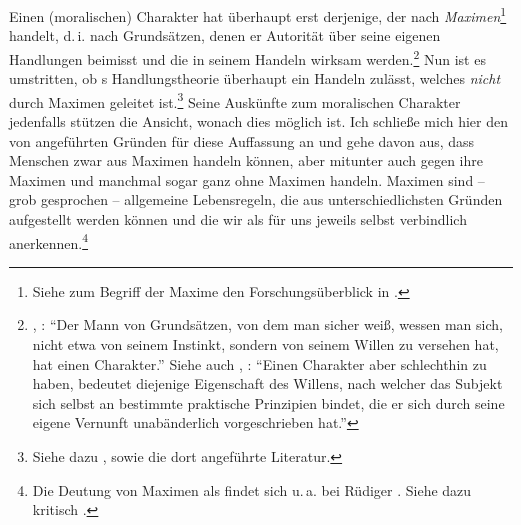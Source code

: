 \label{Abschnitt:MaximenHandlungenFreiheit}
Einen (moralischen) Charakter hat überhaupt erst derjenige, der nach
\emph{Maximen}\footnote{Siehe zum Begriff der Maxime den Forschungsüberblick in
\cite{Gressis:RecentWorkonKantianMaxims2010,Gressis:RecentWorkonKantianMaximsI:EstablishedApproaches2010}.}
handelt, d.\,i. nach Grund\-sät\-zen, denen er Autorität über seine eigenen
Handlungen beimisst und die in seinem Handeln wirksam
werden.\footnote{\cite[Vgl.][A~256]{Kant:AnthropologieinpragmatischerHinsicht1977},
\cite[VII: 285.13--15]{Kant:GesammelteWerke1900ff.}: \enquote{Der Mann von
Grundsätzen, von dem man sicher weiß, wessen man sich, nicht etwa von seinem
Instinkt, sondern von seinem Willen zu versehen hat, hat einen Charakter.} Siehe
auch \cite[A~266]{Kant:AnthropologieinpragmatischerHinsicht1977}, \cite[VII:
292.6--9]{Kant:GesammelteWerke1900ff.}: \enquote{Einen Charakter aber
schlechthin zu haben, bedeutet diejenige Eigenschaft des Willens, nach welcher
das Subjekt sich selbst an bestimmte praktische Prinzipien bindet, die er sich
durch seine eigene Vernunft unabänderlich vorgeschrieben hat.}} Nun ist es
umstritten, ob s Handlungstheorie überhaupt ein
Handeln zulässt, welches \emph{nicht} durch Maximen geleitet ist.\footnote{Siehe
dazu
\cite[][89--92]{Schuessler:KantsethischesLuegenverbot--derSonderfallderLuegeausFurcht2013},
sowie die dort angeführte Literatur.} Seine Auskünfte zum moralischen Charakter
jedenfalls stützen die Ansicht, wonach dies möglich ist. Ich schließe
mich hier den von
angeführten Gründen für diese Auffassung an und gehe davon aus, dass
Menschen zwar aus Maximen handeln können, aber mitunter auch gegen ihre Maximen
und manchmal sogar ganz ohne Maximen handeln. Maximen sind -- grob gesprochen --
allgemeine Lebensregeln, die aus unterschiedlichsten Gründen aufgestellt werden
können und die wir als für uns jeweils selbst verbindlich
anerkennen.\footnote{Die Deutung von Maximen als 
findet sich u.\,a. bei Rüdiger \textcite{Bittner:Maximen1974}. Siehe dazu
kritisch \cite[][62--67]{Schwartz:DerBegriffderMaximebeiKant2006}.}


